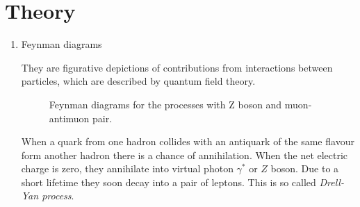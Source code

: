 \documentclass[11pt,a4paper,twoside]{article}
\begin{document}
\section{Theory}
    \begin{enumerate}
        \item Feynman diagrams

        They are figurative depictions of contributions from interactions between particles, which are described by quantum field theory\cite{Jende_Kobel_Pospiech_Bilow_Pedersen_Ould-Saada_Gramstad}.

        \begin{figure}[H]
            \centering

            
            \caption{Feynman diagrams for the processes with Z boson and muon-antimuon pair.}
            \label{fig:001-Z_MyonAntimyon}
        \end{figure}

        When a quark from one hadron collides with an antiquark of the same flavour form another hadron there is a chance of annihilation. When the net electric charge is zero, they annihilate into virtual photon $\gamma^{*}$ or $Z$ boson\cite{ATLAS_Z_lab}. Due to a short lifetime they soon decay into a pair of leptons. This is so called \textit{Drell-Yan process}.


\end{enumerate}
\end{document}
